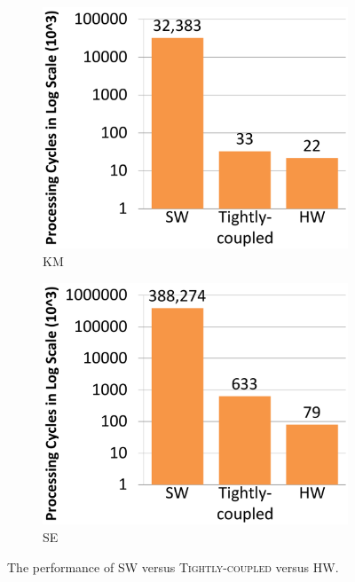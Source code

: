 \begin{figure}
    ~ %
    \begin{subfigure}{0.23\textwidth}
        \includegraphics[width=\textwidth]{Kmean}
        \caption{KM}
        \label{fig:KM}
    \end{subfigure}
    \begin{subfigure}{0.23\textwidth}
        \includegraphics[width=\textwidth]{Sobel}
        \caption{SE}
        \label{fig:SE}
    \end{subfigure}
    \caption{The performance of \textsc{SW} versus \textsc{Tightly-coupled} versus \textsc{HW}. }\label{fig:tight_bench}
\end{figure}

